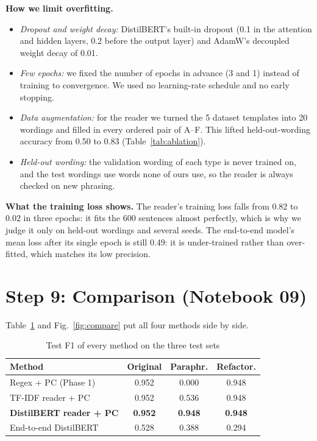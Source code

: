 \documentclass[conference]{IEEEtran}
\begin{document}
\textbf{How we limit overfitting.}
\begin{itemize}
\item \emph{Dropout and weight decay:} DistilBERT's built-in dropout (0.1 in the attention and hidden layers, 0.2
before the output layer) and AdamW's decoupled weight decay of 0.01.
\item \emph{Few epochs:} we fixed the number of epochs in advance (3 and 1) instead of training to convergence. We
used no learning-rate schedule and no early stopping.
\item \emph{Data augmentation:} for the reader we turned the 5 dataset templates into 20 wordings and filled in every
ordered pair of A--F. This lifted held-out-wording accuracy from 0.50 to 0.83 (Table~\ref{tab:ablation}).
\item \emph{Held-out wording:} the validation wording of each type is never trained on, and the test wordings use
words none of ours use, so the reader is always checked on new phrasing.
\end{itemize}

\textbf{What the training loss shows.} The reader's training loss falls from 0.82 to 0.02 in three epochs: it fits
the 600 sentences almost perfectly, which is why we judge it only on held-out wordings and several seeds. The
end-to-end model's mean loss after its single epoch is still 0.49: it is under-trained rather than over-fitted,
which matches its low precision.

\section{Step 9: Comparison (Notebook 09)}
Table~\ref{tab:compare} and Fig.~\ref{fig:compare} put all four methods side by side.

\begin{table}[t]
\centering
\caption{Test F1 of every method on the three test sets}
\label{tab:compare}
\setlength{\tabcolsep}{4pt}
\begin{tabular}{lccc}
\toprule
Method & Original & Paraphr. & Refactor. \\
\midrule
Regex + PC (Phase 1) & 0.952 & 0.000 & 0.948 \\
TF-IDF reader + PC & 0.952 & 0.536 & 0.948 \\
\textbf{DistilBERT reader + PC} & \textbf{0.952} & \textbf{0.948} & \textbf{0.948} \\
End-to-end DistilBERT & 0.528 & 0.388 & 0.294 \\
\bottomrule
\end{tabular}
\end{table}
\end{document}
